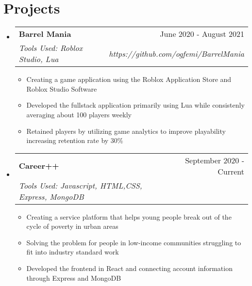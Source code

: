 \documentclass[letterpaper,11pt]{article}
\makeatletter
\newcommand{\resumeItem}[2]{
  \item\small{
    \textbf{#1}{: #2 \vspace{-2pt}}
  }
}
\newcommand{\resumeSubheading}[4]{
  \vspace{-1pt}\item
    \begin{tabular*}{0.97\textwidth}[t]{l@{\extracolsep{\fill}}r}
      \textbf{#1} & #2 \\
      \textit{\small#3} & \textit{\small #4} \\
    \end{tabular*}\vspace{-5pt}
}
\newcommand{\resumeSubSubheading}[2]{
    \begin{tabular*}{0.97\textwidth}{l@{\extracolsep{\fill}}r}
      \textit{\small#1} & \textit{\small #2} \\
    \end{tabular*}\vspace{-5pt}
}
\newcommand{\resumeSubHeadingListStart}{\begin{itemize}[leftmargin=*]}
\newcommand{\resumeSubHeadingListEnd}{\end{itemize}}
\newcommand{\resumeItemListStart}{\begin{itemize}}
\newcommand{\resumeItemListEnd}{\end{itemize}\vspace{-5pt}}
\makeatother
\begin{document}



\section{Projects}
  \resumeSubHeadingListStart
    \resumeSubheading
      {Barrel Mania}{June 2020 - August 2021}
      {Tools Used: Roblox Studio, Lua }{https://github.com/ogfemi/BarrelMania}
      {\begin{itemize}
        \item Creating a game application using the Roblox Application Store and Roblox Studio Software
        \item Developed the fullstack application primarily using Lua while consistenly averaging about 100 players weekly
        \item Retained players by utilizing game analytics to improve playability increasing retention rate by 30\%
      \end{itemize}
      }
    \resumeSubheading
      {Career++}{September 2020 - Current}
      {Tools Used: Javascript, HTML,CSS, Express, MongoDB}{}
      {\begin{itemize}
        \item Creating a service platform that helps young people break out of the cycle of poverty in urban areas
        \item Solving the problem for people in low-income communities struggling to fit into industry standard work
        \item Developed the frontend in React and connecting account information through Express and MongoDB
      \end{itemize}
      }
  \resumeSubHeadingListEnd
\end{document}
